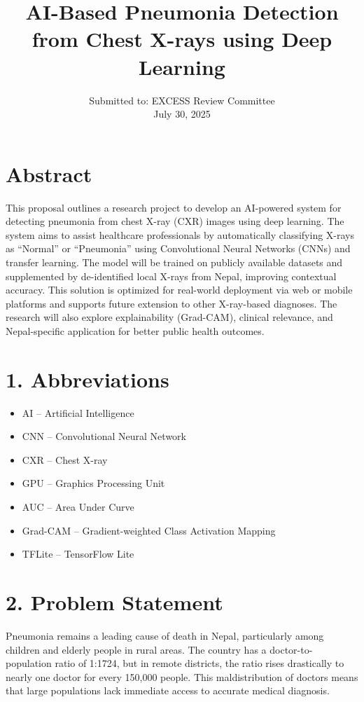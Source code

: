 \documentclass[12pt]{article}
\title{AI-Based Pneumonia Detection from Chest X-rays using Deep Learning}
\author{Submitted to: EXCESS Review Committee\\ \vspace{0.2cm} July 30, 2025}
\date{}
\begin{document}
\maketitle

\section*{Abstract}
This proposal outlines a research project to develop an AI-powered system for detecting pneumonia from chest X-ray (CXR) images using deep learning. The system aims to assist healthcare professionals by automatically classifying X-rays as “Normal” or “Pneumonia” using Convolutional Neural Networks (CNNs) and transfer learning. The model will be trained on publicly available datasets and supplemented by de-identified local X-rays from Nepal, improving contextual accuracy. This solution is optimized for real-world deployment via web or mobile platforms and supports future extension to other X-ray-based diagnoses. The research will also explore explainability (Grad-CAM), clinical relevance, and Nepal-specific application for better public health outcomes.

\section*{1. Abbreviations}
\begin{itemize}[leftmargin=1.5cm]
  \item AI – Artificial Intelligence
  \item CNN – Convolutional Neural Network
  \item CXR – Chest X-ray
  \item GPU – Graphics Processing Unit
  \item AUC – Area Under Curve
  \item Grad-CAM – Gradient-weighted Class Activation Mapping
  \item TFLite – TensorFlow Lite
\end{itemize}

\section*{2. Problem Statement}
Pneumonia remains a leading cause of death in Nepal, particularly among children and elderly people in rural areas. The country has a doctor-to-population ratio of 1:1724, but in remote districts, the ratio rises drastically to nearly one doctor for every 150,000 people. This maldistribution of doctors means that large populations lack immediate access to accurate medical diagnosis.
\end{document}

